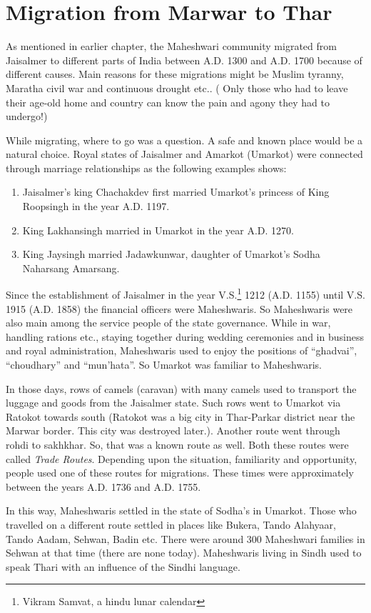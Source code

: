 \chapter{Migration from Marwar to Thar}
As mentioned in earlier chapter, the Maheshwari community migrated from Jaisalmer to different parts of India between A.D. 1300 and A.D. 1700 because of different causes. Main reasons for these migrations might be Muslim tyranny, Maratha civil war and continuous drought etc.. ( Only those who had to leave their age-old home and country can know the pain and agony they had to undergo!)

While migrating, where to go was a question. A safe and known place would be a natural choice. Royal states of Jaisalmer and Amarkot (Umarkot) were connected through marriage relationships as the following examples shows:
\begin{enumerate}
 \item Jaisalmer's king Chachakdev first married Umarkot's princess of King Roopsingh in the year A.D. 1197.
\item King Lakhansingh married in Umarkot in the year A.D. 1270.
\item King Jaysingh married Jadawkunwar, daughter of Umarkot's Sodha Naharsang Amarsang.
\end{enumerate}

Since the establishment of Jaisalmer in the year V.S.\footnote{Vikram Samvat, a hindu lunar calendar} 1212 (A.D. 1155) until V.S. 1915 (A.D. 1858) the financial officers were Maheshwaris. So Maheshwaris were also main among the service people of the state governance. While in war, handling rations etc., staying together during wedding ceremonies and in business and royal administration, Maheshwaris used to enjoy the positions of ``ghadvai'', ``choudhary'' and ``mun'hata''. So Umarkot was familiar to Maheshwaris.

In those days, rows of camels (caravan) with many camels used to transport the luggage and goods from the Jaisalmer state. Such rows went to Umarkot via Ratokot towards south (Ratokot was a big city in Thar-Parkar district near the Marwar border. This city was destroyed later.). Another route went through rohdi to sakhkhar. So, that was a known route as well. Both these routes were called \textit{Trade Routes}. Depending upon the situation, familiarity and opportunity, people used one of these routes for migrations. These times were approximately between the years A.D. 1736 and A.D. 1755.

In this way, Maheshwaris settled in the state of Sodha's in Umarkot. Those who travelled on a different route settled in places like Bukera, Tando Alahyaar, Tando Aadam, Sehwan, Badin etc. There were around 300 Maheshwari families in Sehwan at that time (there are none today). Maheshwaris living in Sindh used to speak Thari with an influence of the Sindhi language.

